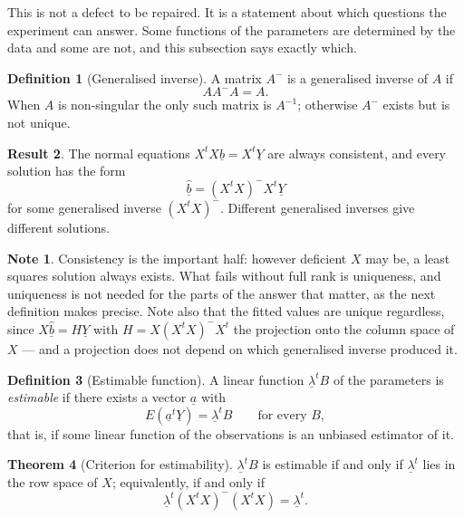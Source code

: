 \documentclass[11pt,a4paper]{article}
\theoremstyle{definition}
\newtheorem{thm}{Theorem}[subsection]
\newtheorem{defn}[thm]{Definition}
\newtheorem*{note}{Note}
\newtheorem{result}[thm]{Result}
\begin{document}
This is not a defect to be repaired. It is a statement about which questions
the experiment can answer. Some functions of the parameters are determined by
the data and some are not, and this subsection says exactly which.

\begin{defn}[Generalised inverse]
\label{res:defn:ginv}
A matrix $A^{-}$ is a generalised inverse of $A$ if
$$A A^{-} A = A.$$
When $A$ is non-singular the only such matrix is $A^{-1}$; otherwise $A^{-}$
exists but is not unique.
\end{defn}

\begin{result}
\label{res:result:normalsol}
The normal equations $X^tX\underline{b}=X^t\underline{Y}$ are always
consistent, and every solution has the form
$$\widehat{\underline{b}}=\left(X^tX\right)^{-}X^t\underline{Y}$$
for some generalised inverse $\left(X^tX\right)^{-}$. Different generalised
inverses give different solutions.
\end{result}

\begin{note}
Consistency is the important half: however deficient $X$ may be, a least
squares solution always exists. What fails without full rank is uniqueness,
and uniqueness is not needed for the parts of the answer that matter, as the
next definition makes precise. Note also that the fitted values are unique
regardless, since $X\widehat{\underline{b}}=H\underline{Y}$ with
$H=X\left(X^tX\right)^{-}X^t$ the projection onto the column space of $X$ ---
and a projection does not depend on which generalised inverse produced it.
\end{note}

\begin{defn}[Estimable function]
A linear function $\underline{\lambda}^tB$ of the parameters is
\emph{estimable} if there exists a vector $\underline{a}$ with
$$E\left(\underline{a}^t\underline{Y}\right)=\underline{\lambda}^tB
\qquad\text{for every }B,$$
that is, if some linear function of the observations is an unbiased estimator
of it.
\end{defn}

\begin{thm}[Criterion for estimability]
\label{res:thm:estcrit}
$\underline{\lambda}^tB$ is estimable if and only if
$\underline{\lambda}^t$ lies in the row space of $X$; equivalently, if and
only if
$$\underline{\lambda}^t\left(X^tX\right)^{-}\left(X^tX\right)
=\underline{\lambda}^t .$$
\end{thm}
\end{document}
